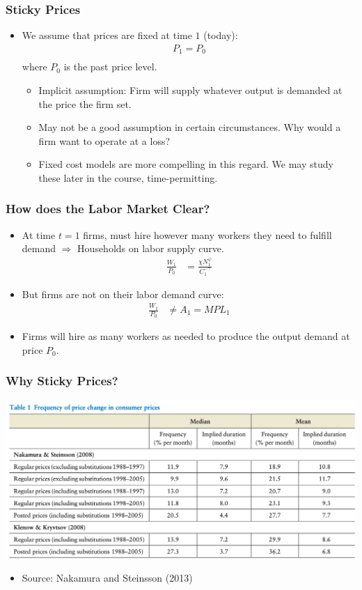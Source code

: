 \documentclass[english,xcolor=svgnames]{beamer}
\begin{document}
\begin{frame}
\frametitle{Sticky Prices
}
\begin{itemize}
	\item We assume that prices are fixed at time $1$ (today):
	\begin{align*}
		P_1 = P_0 \\
	\end{align*}
	where $P_0$ is the past price level.
	\begin{itemize}
		\item Implicit assumption: Firm will supply whatever output is demanded at the price the firm set.
		\item May not be a good assumption in certain circumstances. Why would a firm want to operate at a loss?
		\item Fixed cost models are more compelling in this regard. We may study these later in the course, time-permitting.
	\end{itemize}
\end{itemize}	
\end{frame}



\begin{frame}
\frametitle{How does the Labor Market Clear?
}
\begin{itemize}
	\item At time $t=1$ firms, must hire however many workers they need to fulfill demand $\Rightarrow$ Households on labor supply curve.
	\begin{align*}
		\frac{W_1}{P_0}&=\frac{\chi N_1^\varphi}{C_1^{-\gamma}}
	\end{align*}
	\item But firms are not on their labor demand curve:
	\begin{align*}
		\frac{W_1}{P_0}&\neq   A_1  = MPL_1
	\end{align*}
	\item Firms will hire as many workers as needed to produce the output demand at price $P_0$.
\end{itemize}	
\end{frame}

\begin{frame}
\frametitle{Why Sticky Prices?
}
\begin{center}
	\includegraphics[scale=0.5]{../../images/NS2013frequency.png}
\end{center}
\begin{itemize}
	\item Source: Nakamura and Steinsson (2013)
\end{itemize}	
\end{frame}
\end{document}
